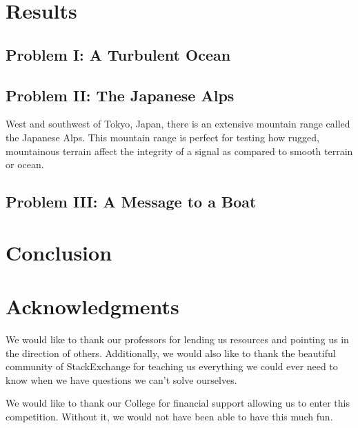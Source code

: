 \documentclass[11pt]{article}
\numberwithin{equation}{section}
\begin{document}


\section{Results} %
\label{sec:results}

 \subsection{Problem I: A Turbulent Ocean} %
 \label{sub:part_i}

 \subsection{Problem II: The Japanese Alps} %
 \label{sub:part_ii}
 West and southwest of Tokyo, Japan, there is an extensive mountain range called the Japanese Alps. This mountain range is perfect for testing how rugged, mountainous terrain affect the integrity of a signal as compared to smooth terrain or ocean.

 \subsection{Problem III: A Message to a Boat} %
 \label{sub:part_iii}
 
 

\section{Conclusion}
\label{sec: conclusion}

\section*{Acknowledgments}
\label{sec: acknowledge}
We would like to thank our professors for lending us resources and pointing us in the direction of others. Additionally, we would also like to thank the beautiful community of StackExchange for teaching us everything we could ever need to know when we have questions we can't solve ourselves. 

 We would like to thank our College for financial support allowing us to enter this competition. Without it, we would not have been able to have this much fun. 


\newpage 


\end{document}
